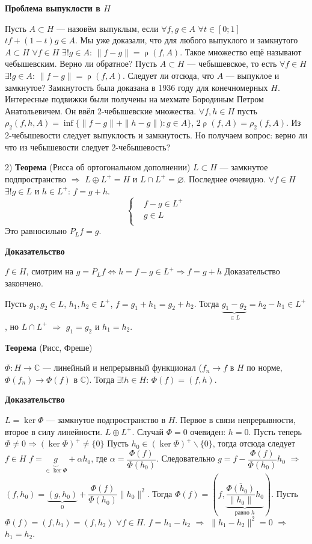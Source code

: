 \documentclass[12pt]{article}
\DeclareMathOperator{\rh}{\rho}
\begin{document}
\textbf{Проблема выпуклости в $H$}

Пусть $A\subset H$ --- назовём выпуклым, если $\forall f,g\in A$ $\forall t\in[0;1]$ $tf+(1-t)g\in A$.
Мы уже доказали, что для любого выпуклого и замкнутого $A\subset H$ $\forall f\in H$ $\exists!g\in A$: $\|f-g\|=\rh(f,A)$.
Такое множество ещё называют чебышевским.
Верно ли обратное? Пусть $A\subset H$ --- чебышевское, то есть $\forall f\in H$ $\exists!g\in A$: $\|f-g\|=\rh(f,A)$. 
Следует ли отсюда, что $A$ --- выпуклое и замкнутое?
Замкнутость была доказана в 1936 году для конечномерных $H$.
Интересные подвижки были получены на мехмате Бородиным Петром Анатольевичем.
Он ввёл 2-чебышевские множества.
$\forall f,h\in H$ пусть $\rho_2(f,h,A)=\inf\{\|f-g\|+\|h-g\|):g\in A\}$, $2\rh(f,A)=\rho_2(f,A)$.
Из 2-чебышевости следует выпуклость и замкнутость.
Но получаем вопрос: верно ли что из чебышевости следует 2-чебышевость?

2) \textbf{Теорема} (Рисса об ортогональном дополнении)
$L\subset H$ --- замкнутое подпространство $\Rightarrow$ $L\oplus L^+=H$ и $L\cap L^+=\varnothing$.
Последнее очевидно. 
$\forall f\in H$ $\exists! g\in L$ и $h\in L^+$: $f=g+h$.
$$
\left\{
\begin{aligned}
&f-g\in L^{+}\\
&g\in L\\
\end{aligned}
\right.
$$
Это равносильно $P_Lf=g$.

\textbf{Доказательство}

$f\in H$, смотрим на $g=P_Lf\Leftrightarrow h=f-g\in L^+\Rightarrow f=g+h$ Доказательство закончено.

Пусть $g_1,g_2\in L$, $h_1, h_2\in L^+$,  $f=g_1+h_1=g_2+h_2$.
Тогда $\underbrace{g_1-g_2}_{\in L}=h_2-h_1\in L^+$, но $L\cap L^+$ $\Rightarrow$ $g_1=g_2$ и $h_1=h_2$.

\textbf{Теорема} (Рисс, Фреше)

$\Phi:H\to\mathbb C$ --- линейный и непрерывный функционал ($f_n\to f$ в $H$ по норме, $\Phi(f_n)\to\Phi(f)$ в $\mathbb C$).
Тогда $\exists!h\in H$: $\Phi(f)=(f,h)$.

\textbf{Доказательство}

$L=\ker \Phi$ --- замкнутое подпространство в $H$.
Первое в связи непрерывности, второе в силу линейности.
$L\oplus L^+$.
Случай $\Phi=0$ очевиден: $h=0$.
Пусть теперь $\Phi\ne0\Rightarrow(\ker\Phi)^+\ne\{0\}$
Пусть $h_0\in(\ker\Phi)^+\backslash\{0\}$, тогда отсюда следует $f\in H$ $f=\underbrace{g}_{\in \ker \Phi}+\alpha h_0$, где $\alpha=\dfrac{\Phi(f)}{\Phi(h_0)}$.
Следовательно $g=f-\dfrac{\Phi(f)}{\Phi(h_0)}h_0$ $\Rightarrow$ $(f,h_0)=\underbrace{(g,h_0)}_{0}+\dfrac{\Phi(f)}{\Phi(h_0)}\|h_0\|^2$.
Тогда $\Phi(f)=(f, \underbrace{\dfrac{\overline{\Phi(h_0)}}{\|h_0\|}h_0}_{\text{равно }h})$.
Пусть $\Phi(f)=(f,h_1)=(f,h_2)$ $\forall f\in H$.
$f=h_1-h_2$ $\Rightarrow$ $\|h_1-h_2\|^2=0$ $\Rightarrow$ $h_1=h_2$.
\end{document}
